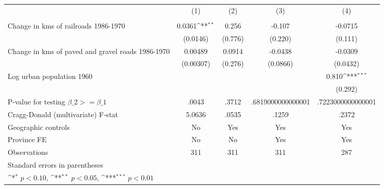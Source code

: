 {
\def\sym#1{\ifmmode^{#1}\else\(^{#1}\)\fi}
\begin{tabular}{l*{4}{c}}
\hline\hline
                &\multicolumn{1}{c}{(1)}&\multicolumn{1}{c}{(2)}&\multicolumn{1}{c}{(3)}&\multicolumn{1}{c}{(4)}\\
                &\multicolumn{1}{c}{}&\multicolumn{1}{c}{}&\multicolumn{1}{c}{}&\multicolumn{1}{c}{}\\
\hline
Change in kms of railroads 1986-1970&   0.0361\sym{**} &    0.256         &   -0.107         &  -0.0715         \\
                & (0.0146)         &  (0.776)         &  (0.220)         &  (0.111)         \\
[1em]
Change in kms of paved and gravel roads 1986-1970&  0.00489         &   0.0914         &  -0.0438         &  -0.0309         \\
                &(0.00307)         &  (0.276)         & (0.0866)         & (0.0432)         \\
[1em]
Log urban population 1960&                  &                  &                  &    0.810\sym{***}\\
                &                  &                  &                  &  (0.292)         \\
\hline
P-value for testing $\beta\_{2} >= \beta\_{1}$&    .0043         &    .3712         &.6819000000000001         &.7223000000000001         \\
Cragg-Donald (multivariate) F-stat&   5.0636         &    .0535         &    .1259         &    .2372         \\
Geographic controls&       No         &      Yes         &      Yes         &      Yes         \\
Province FE     &       No         &       No         &      Yes         &      Yes         \\
Observations    &      311         &      311         &      311         &      287         \\
\hline\hline
\multicolumn{5}{l}{\footnotesize Standard errors in parentheses}\\
\multicolumn{5}{l}{\footnotesize \sym{*} \(p<0.10\), \sym{**} \(p<0.05\), \sym{***} \(p<0.01\)}\\
\end{tabular}
}
